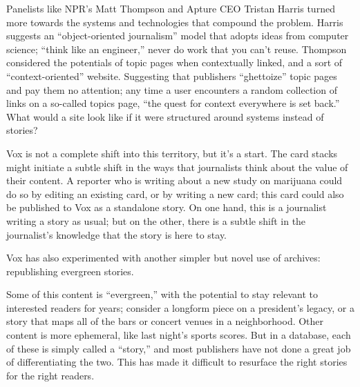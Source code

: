 Panelists like NPR's Matt Thompson and Apture CEO Tristan Harris turned more towards the systems and technologies that compound the problem. Harris suggests an ``object-oriented journalism'' model that adopts ideas from computer science; ``think like an engineer,'' never do work that you can't reuse. Thompson considered the potentials of topic pages when contextually linked, and a sort of ``context-oriented'' website. Suggesting that publishers ``ghettoize'' topic pages and pay them no attention; any time a user encounters a random collection of links on a so-called topics page, ``the quest for context everywhere is set back.'' What would a site look like if it were structured around systems instead of stories?

Vox is not a complete shift into this territory, but it's a start. The card stacks might initiate a subtle shift in the ways that journalists think about the value of their content. A reporter who is writing about a new study on marijuana could do so by editing an existing card, or by writing a new card; this card could also be published to Vox as a standalone story. On one hand, this is a journalist writing a story as usual; but on the other, there is a subtle shift in the journalist's knowledge that the story is here to stay.

Vox has also experimented with another simpler but novel use of archives: republishing evergreen stories.








Some of this content is ``evergreen,'' with the potential to stay relevant to interested readers for years; consider a longform piece on a president's legacy, or a story that maps all of the bars or concert venues in a neighborhood. Other content is more ephemeral, like last night's sports scores. But in a database, each of these is simply called a ``story,'' and most publishers have not done a great job of differentiating the two. This has made it difficult to resurface the right stories for the right readers.

